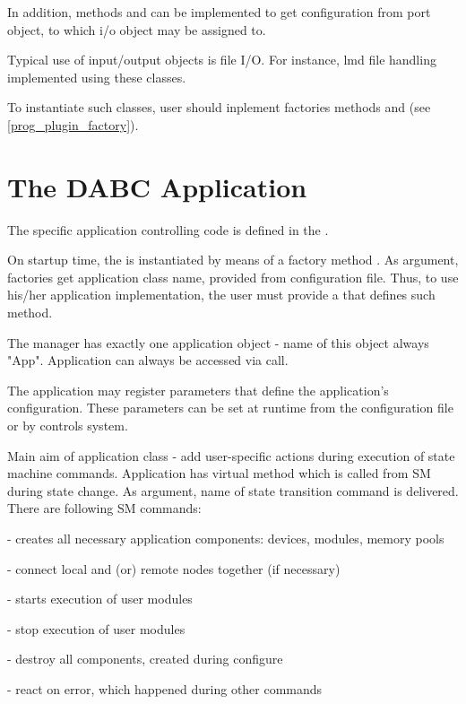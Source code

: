 In addition, methods  and
 can be implemented to get 
configuration from port object, to which i/o object may be assigned to.  

Typical use of input/output objects is file I/O. 
For instance, lmd file handling implemented
using these classes.

To instantiate such classes, user should inplement factories methods 
 and  (see \ref{prog_plugin_factory}).


\section{The DABC Application}
\label{prog_plugin_applicaton}
The specific application controlling code is defined in the .

On startup time, the  is instantiated
by means of a factory method .
As argument, factories get application class name, provided from configuration file.
Thus, to use his/her application implementation, 
the user must provide a  that defines such method.

The manager has exactly one application object - name of this object always "App".
Application can always be accessed via  call. 

The application  may register parameters that 
define the application's configuration. These parameters can be set at 
runtime from the configuration file or by controls system.

Main aim of application class - add user-specific actions during
execution of state machine commands. Application has virtual method 
 which is called from SM during state change.
As argument, name of state transition command is delivered. 
There are following SM commands:

\bdes
\item[\keyw{dabc::Manager::stcmdDoConfigure}] - creates all necessary application components: devices, modules, memory pools
\item[\keyw{dabc::Manager::stcmdDoEnable}] - connect local and (or) remote nodes together (if necessary) 
\item[\keyw{dabc::Manager::stcmdDoStart}] - starts execution of user modules 
\item[\keyw{dabc::Manager::stcmdDoStop}] - stop execution of user modules
\item[\keyw{dabc::Manager::stcmdDoHalt}] - destroy all components, created during configure
\item[\keyw{dabc::Manager::stcmdDoError}] - react on error, which happened during other commands
\edes
  

